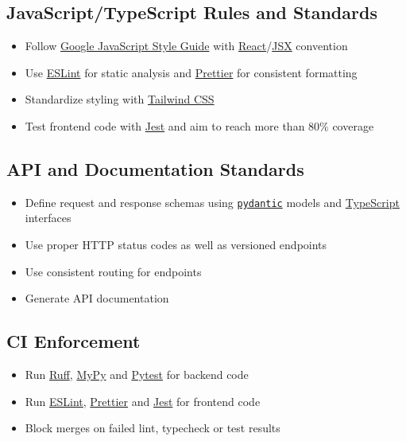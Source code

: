 \documentclass{article}
\begin{document}
\subsection*{JavaScript/TypeScript Rules and Standards}
\begin{itemize}
    \item Follow \href{https://google.github.io/styleguide/jsguide.html}{Google JavaScript Style Guide} with \href{https://reactjs.org/}{React}/\href{https://reactjs.org/docs/introducing-jsx.html}{JSX} convention
    \item Use \href{https://eslint.org/}{ESLint} for static analysis and \href{https://prettier.io/}{Prettier} for consistent formatting
    \item Standardize styling with \href{https://tailwindcss.com/}{Tailwind CSS}
    \item Test frontend code with \href{https://jestjs.io/}{Jest} and aim to reach more than 80\% coverage
\end{itemize}

\subsection*{API and Documentation Standards}
\begin{itemize}
    \item Define request and response schemas using \href{https://pydantic-docs.helpmanual.io/}{\texttt{pydantic}} models and \href{https://www.typescriptlang.org/}{TypeScript} interfaces
    \item Use proper HTTP status codes as well as versioned endpoints
    \item Use consistent routing for endpoints
    \item Generate API documentation
\end{itemize}

\subsection*{CI Enforcement}
\begin{itemize}
    \item Run \href{https://docs.astral.sh/ruff/}{Ruff}, \href{https://mypy.readthedocs.io/}{MyPy} and \href{https://pytest.org/}{Pytest} for backend code
    \item Run \href{https://eslint.org/}{ESLint}, \href{https://prettier.io/}{Prettier} and \href{https://jestjs.io/}{Jest} for frontend code
    \item Block merges on failed lint, typecheck or test results
\end{itemize}
\end{document}
